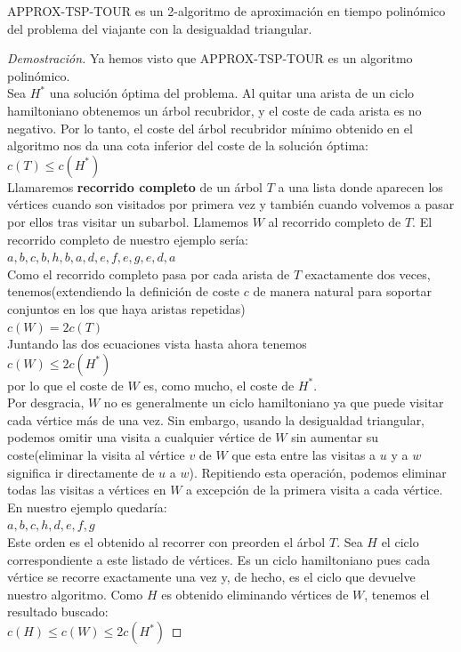 \documentclass{article}
\begin{document}
\begin{thr}
APPROX-TSP-TOUR es un 2-algoritmo de aproximaci\'on en tiempo polin\'omico del problema del viajante con la desigualdad triangular.
\end{thr}
\begin{proof}[Demostración]
Ya hemos visto que APPROX-TSP-TOUR es un algoritmo polinómico. \\
Sea $H^{*}$ una solución óptima del problema. Al quitar una arista de un ciclo hamiltoniano obtenemos un árbol recubridor, y el coste de cada arista es no negativo. Por lo tanto, el coste del árbol recubridor mínimo obtenido en el algoritmo nos da una cota inferior del coste de la solución óptima:\\
$c(T) \leq c(H^{*})$\\
Llamaremos \textbf{recorrido completo} de un árbol $T$ a una lista donde aparecen los vértices cuando son visitados por primera vez y también cuando volvemos a pasar por ellos tras visitar un subarbol. Llamemos $W$ al recorrido completo de $T$. El recorrido completo de nuestro ejemplo sería:\\
$a, b, c, b, h, b, a, d, e, f, e, g, e, d, a$\\
Como el recorrido completo pasa por cada arista de $T$ exactamente dos veces, tenemos(extendiendo la definición de coste $c$ de manera natural para soportar conjuntos en los que haya aristas repetidas)\\
$c(W) = 2c(T)$\\
Juntando las dos ecuaciones vista hasta ahora tenemos\\
$c(W) \leq 2c(H^{*})$\\
por lo que el coste de $W$ es, como mucho, el coste de $H^{*}$.\\
Por desgracia, $W$ no es generalmente un ciclo hamiltoniano ya que puede visitar cada vértice más de una vez. Sin embargo, usando la desigualdad triangular, podemos omitir una visita a cualquier vértice de $W$ sin aumentar su coste(eliminar la visita al vértice $v$ de $W$ que esta entre las visitas a $u$ y a $w$ significa ir directamente de $u$ a $w$). Repitiendo esta operación, podemos eliminar todas las visitas a vértices en $W$ a excepción de la primera visita a cada vértice. En nuestro ejemplo quedaría:\\
$a, b, c, h, d, e, f, g$\\
Este orden es el obtenido al recorrer con preorden el árbol $T$. Sea $H$ el ciclo correspondiente a este listado de vértices. Es un ciclo hamiltoniano pues cada vértice se recorre exactamente una vez y, de hecho, es el ciclo que devuelve nuestro algoritmo. Como $H$  es obtenido eliminando vértices de $W$, tenemos el resultado buscado:\\
$c(H) \leq c(W) \leq 2c(H^{*})$
\end{proof}
	
\end{document}
